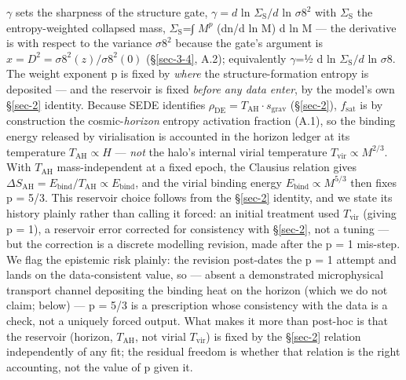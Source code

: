 \documentclass[preprint,12pt]{elsarticle}
\begin{document}
\(\gamma\) sets the sharpness of the structure gate, \(\gamma  = d\) ln
\(\Sigma _{\mathrm{S}} / d\) ln \(\sigma 8^{2}\) with
\(\Sigma _{\mathrm{S}}\) the entropy-weighted collapsed mass,
\(\Sigma _{\mathrm{S}}\)=∫ \(M^{p}\) (dn/d ln M) d ln M --- the
derivative is with respect to the variance \(\sigma 8^{2}\) because the
gate's argument is \(x = D^{2} = \sigma 8^{2}(z)/\sigma 8^{2}(0)\)
(§\ref{sec-3-4}, A.2); equivalently \(\gamma\)=½ d ln
\(\Sigma _{\mathrm{S}}/d\) ln \(\sigma 8\). The weight exponent p is
fixed by \emph{where} the structure-formation entropy is deposited ---
and the reservoir is fixed \emph{before any data enter}, by the model's
own §\ref{sec-2} identity. Because SEDE identifies
\(\rho _\mathrm{DE} = T_\mathrm{AH}\cdot s_{\mathrm{grav}}\)
(§\ref{sec-2}), \(f_{\mathrm{sat}}\) is by construction the
cosmic-\emph{horizon} entropy activation fraction (A.1), so the binding
energy released by virialisation is accounted in the horizon ledger at
its temperature \(T_\mathrm{AH} \propto  H\) --- \emph{not} the halo's
internal virial temperature \(T_{\mathrm{vir}} \propto  M^{2/3}\). With
\(T_\mathrm{AH}\) mass-independent at a fixed epoch, the Clausius
relation gives
\(\Delta S_\mathrm{AH} = E_{\mathrm{bind}}/T_\mathrm{AH} \propto  E_{\mathrm{bind}}\),
and the virial binding energy \(E_{\mathrm{bind}} \propto  M^{5/3}\)
then fixes p = 5/3. This reservoir choice follows from the §\ref{sec-2}
identity, and we state its history plainly rather than calling it
forced: an initial treatment used \(T_{\mathrm{vir}}\) (giving p = 1), a
reservoir error corrected for consistency with §\ref{sec-2}, not a
tuning --- but the correction is a discrete modelling revision, made
after the p = 1 mis-step. We flag the epistemic risk plainly: the
revision post-dates the p = 1 attempt and lands on the data-consistent
value, so --- absent a demonstrated microphysical transport channel
depositing the binding heat on the horizon (which we do not claim;
below) --- p = 5/3 is a prescription whose consistency with the data is
a check, not a uniquely forced output. What makes it more than post-hoc
is that the reservoir (horizon, \(T_\mathrm{AH}\), not virial
\(T_{\mathrm{vir}}\)) is fixed by the §\ref{sec-2} relation
independently of any fit; the residual freedom is whether that relation
is the right accounting, not the value of p given it.
\end{document}

